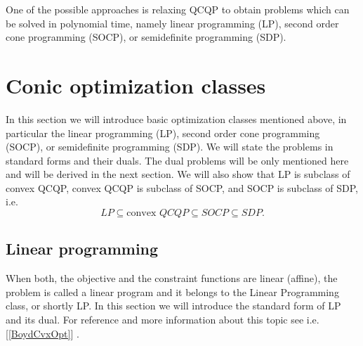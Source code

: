 \documentclass[10pt,oneside]{book}
\theoremstyle{definition}
\begin{document}
One of the possible approaches is relaxing QCQP to obtain problems which can be solved in polynomial time, namely linear programming (LP), second order cone programming  (SOCP), or semidefinite programming (SDP). 

\section{Conic optimization classes}
\label{ConicOptClasses}

In this section we will introduce basic optimization classes mentioned above, in particular the  linear programming (LP), second order cone programming  (SOCP), or semidefinite programming (SDP). We will state the problems in standard forms and their duals. The dual problems will be only mentioned here and will be derived in the next section. We will also show that LP is subclass of convex QCQP, convex QCQP is subclass of SOCP, and SOCP is subclass of SDP, i.e.
\begin{equation}
LP\subseteq \mbox{convex } QCQP \subseteq SOCP \subseteq SDP.
\end{equation}












\subsection{Linear programming}

When both, the objective and the constraint functions are linear (affine), the problem is called a linear program and it belongs to the Linear Programming class, or shortly LP.
In this section we will introduce the standard form of LP and its dual. For reference and more information about this topic see i.e. [\ref{BoydCvxOpt}] .
\end{document}
